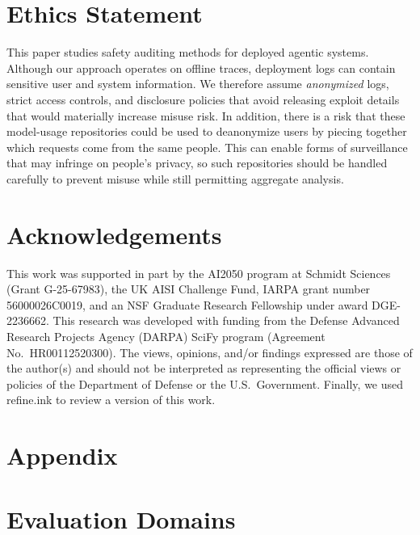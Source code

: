 \documentclass{article} %
\begin{document}
\section*{Ethics Statement}
This paper studies safety auditing methods for deployed agentic systems.
Although our approach operates on offline traces, deployment logs can contain sensitive user and system information.
We therefore assume \textit{anonymized} logs, strict access controls, and disclosure policies that avoid releasing exploit details that would materially increase misuse risk.
In addition, there is a risk that these model-usage repositories could be used to deanonymize users by piecing together which requests come from the same people. This can enable forms of surveillance that may infringe on people's privacy, so such repositories should be handled carefully to prevent misuse while still permitting aggregate analysis.

\section*{Acknowledgements}

This work was supported in part by the AI2050 program at Schmidt Sciences (Grant G-25-67983), the UK AISI Challenge Fund, IARPA grant number 56000026C0019, and an NSF Graduate Research Fellowship under award DGE-2236662. This research was developed with funding from the Defense Advanced Research Projects Agency (DARPA) SciFy program (Agreement No.\ HR00112520300). The views, opinions, and/or findings expressed are those of the author(s) and should not be interpreted as representing the official views or policies of the Department of Defense or the U.S.\ Government. Finally, we used refine.ink to review a version of this work.






\newpage

\appendix
\section{Appendix}

\section{Evaluation Domains}
\label{app:eval-properties}
\end{document}
